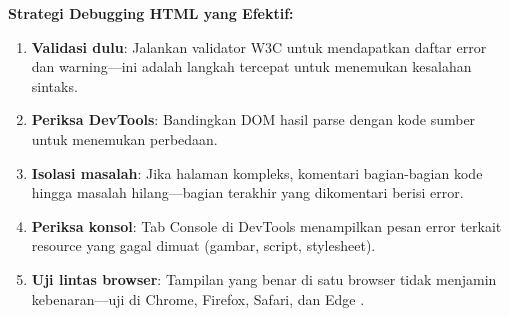 \begin{konsep}
\textbf{Strategi Debugging HTML yang Efektif:}
\begin{enumerate}
  \item \textbf{Validasi dulu}: Jalankan validator W3C untuk mendapatkan daftar error dan warning---ini adalah langkah tercepat untuk menemukan kesalahan sintaks.
  \item \textbf{Periksa DevTools}: Bandingkan DOM hasil parse dengan kode sumber untuk menemukan perbedaan.
  \item \textbf{Isolasi masalah}: Jika halaman kompleks, komentari bagian-bagian kode hingga masalah hilang---bagian terakhir yang dikomentari berisi error.
  \item \textbf{Periksa konsol}: Tab Console di DevTools menampilkan pesan error terkait resource yang gagal dimuat (gambar, script, stylesheet).
  \item \textbf{Uji lintas browser}: Tampilan yang benar di satu browser tidak menjamin kebenaran---uji di Chrome, Firefox, Safari, dan Edge \cite{mdnHtmlIntro}.
\end{enumerate}
\end{konsep}

